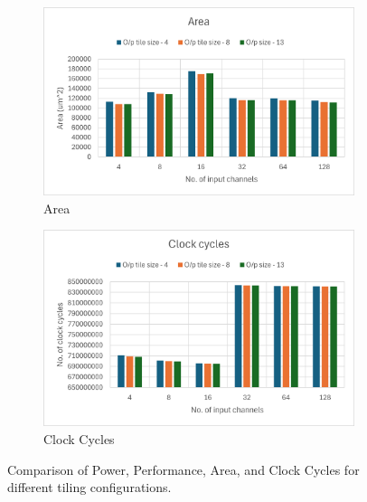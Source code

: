 \begin{figure}[h!]
    \vspace{0.5cm} %

    \begin{subfigure}{0.45\textwidth}
   \centering
   \includegraphics[width=\linewidth]{figure/chapter4_results/figure 3 - area.png}
   \caption{Area}
   \label{fig:area}
    \end{subfigure}
    \hfill
    \begin{subfigure}{0.45\textwidth}
   \centering
   \includegraphics[width=\linewidth]{figure/chapter4_results/clockcycles.png}
   \caption{Clock Cycles}
   \label{fig:clock}
    \end{subfigure}

    \caption{Comparison of Power, Performance, Area, and Clock Cycles for different tiling configurations.}
    \label{fig:tileConvolutionCase2plot}
\end{figure}

